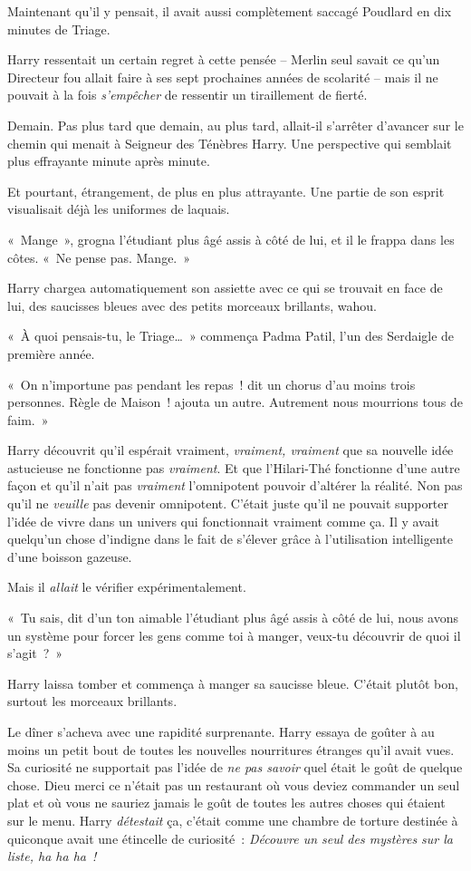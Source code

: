 Maintenant qu'il y pensait, il avait aussi complètement saccagé Poudlard en dix minutes de Triage.

Harry ressentait un certain regret à cette pensée -- Merlin seul savait ce qu'un Directeur fou allait faire à ses sept prochaines années de scolarité -- mais il ne pouvait à la fois \emph{s'empêcher} de ressentir un tiraillement de fierté.

Demain. Pas plus tard que demain, au plus tard, allait-il s'arrêter d'avancer sur le chemin qui menait à Seigneur des Ténèbres Harry. Une perspective qui semblait plus effrayante minute après minute.

Et pourtant, étrangement, de plus en plus attrayante. Une partie de son esprit visualisait déjà les uniformes de laquais.

«~Mange~», grogna l'étudiant plus âgé assis à côté de lui, et il le frappa dans les côtes. «~Ne pense pas. Mange.~»

Harry chargea automatiquement son assiette avec ce qui se trouvait en face de lui, des saucisses bleues avec des petits morceaux brillants, wahou.

«~À quoi pensais-tu, le Triage…~» commença Padma Patil, l'un des Serdaigle de première année.

«~On n'importune pas pendant les repas~! dit un chorus d'au moins trois personnes. Règle de Maison~! ajouta un autre. Autrement nous mourrions tous de faim.~»

Harry découvrit qu'il espérait vraiment, \emph{vraiment, vraiment} que sa nouvelle idée astucieuse ne fonctionne pas \emph{vraiment}. Et que l'Hilari-Thé fonctionne d'une autre façon et qu'il n'ait pas \emph{vraiment} l'omnipotent pouvoir d'altérer la réalité. Non pas qu'il ne \emph{veuille} pas devenir omnipotent. C'était juste qu'il ne pouvait supporter l'idée de vivre dans un univers qui fonctionnait vraiment comme ça. Il y avait quelqu'un chose d'indigne dans le fait de s'élever grâce à l'utilisation intelligente d'une boisson gazeuse.

Mais il \emph{allait} le vérifier expérimentalement.

«~Tu sais, dit d'un ton aimable l'étudiant plus âgé assis à côté de lui, nous avons un système pour forcer les gens comme toi à manger, veux-tu découvrir de quoi il s'agit~?~»

Harry laissa tomber et commença à manger sa saucisse bleue. C'était plutôt bon, surtout les morceaux brillants.

Le dîner s'acheva avec une rapidité surprenante. Harry essaya de goûter à au moins un petit bout de toutes les nouvelles nourritures étranges qu'il avait vues. Sa curiosité ne supportait pas l'idée de \emph{ne pas savoir} quel était le goût de quelque chose. Dieu merci ce n'était pas un restaurant où vous deviez commander un seul plat et où vous ne sauriez jamais le goût de toutes les autres choses qui étaient sur le menu. Harry \emph{détestait} ça, c'était comme une chambre de torture destinée à quiconque avait une étincelle de curiosité~: \emph{Découvre un seul des mystères sur la liste, ha ha ha~!}

